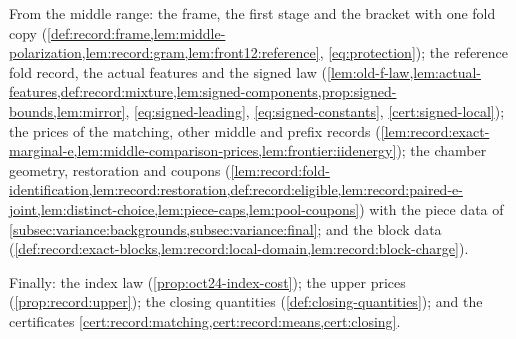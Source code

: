 From the middle range: the frame, the first stage and the bracket with one fold
copy
(\cref{def:record:frame,lem:middle-polarization,lem:record:gram,lem:front12:reference},
\eqref{eq:protection}); the reference fold record, the actual features and the
signed law
(\cref{lem:old-f-law,lem:actual-features,def:record:mixture,lem:signed-components,prop:signed-bounds,lem:mirror},
\eqref{eq:signed-leading}, \eqref{eq:signed-constants}, \cref{cert:signed-local});
the prices of the matching, other middle and prefix records
(\cref{lem:record:exact-marginal-e,lem:middle-comparison-prices,lem:frontier:iidenergy});
the chamber geometry, restoration and coupons
(\cref{lem:record:fold-identification,lem:record:restoration,def:record:eligible,lem:record:paired-e-joint,lem:distinct-choice,lem:piece-caps,lem:pool-coupons})
with the piece data of \cref{subsec:variance:backgrounds,subsec:variance:final}; and
the block data
(\cref{def:record:exact-blocks,lem:record:local-domain,lem:record:block-charge}).

Finally: the index law (\cref{prop:oct24-index-cost}); the upper prices
(\cref{prop:record:upper}); the closing quantities
(\cref{def:closing-quantities}); and the certificates
\cref{cert:record:matching,cert:record:means,cert:closing}.
